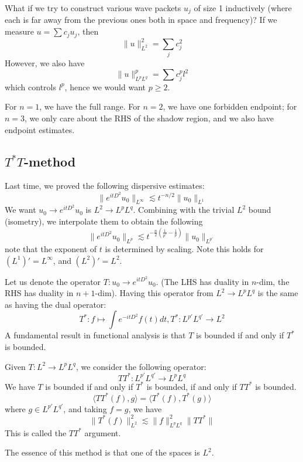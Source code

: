 What if we try to construct various wave packets $u_j$ of size 1 inductively (where each is far away from the previous ones both in space and frequency)? If we measure $u=\sum c_ju_j$, then 
\begin{equation*}
    \|u\|_{L^2}^2=\sum_jc_j^2
\end{equation*}
However, we also have
\begin{equation*}
    \|u\|_{L^pL^q}^p=\sum c_j^pl^2
\end{equation*}
which controls $l^p$, hence we would want $p\geq 2$. 

For $n=1$, we have the full range. For $n=2$, we have one forbidden endpoint; for $n=3$, we only care about the RHS of the shadow region, and we also have endpoint estimates.

\subsection{$T^*T$-method}
Last time, we proved the following dispersive estimates:
\begin{equation*}
    \|e^{itD^2}u_0\|_{L^\infty}\lesssim t^{-n/2}\|u_0\|_{L^1}
\end{equation*}
We want $u_0\to e^{itD^2}u_0$ is $L^2\to L^pL^q$. Combining with the trivial $L^2$ bound (isometry), we interpolate them to obtain the following
\begin{equation*}
    \|e^{itD^2}u_0\|_{L^p}\lesssim t^{-\frac{n}{2}(\frac{1}{p'}-\frac{1}{p})}\|u_0\|_{L^{p'}}
\end{equation*}
note that the exponent of $t$ is determined by scaling. Note this holds for $(L^1)'=L^\infty$, and $(L^2)'=L^2$.

Let us denote the operator $T: u_0\to e^{itD^2}u_0$. (The LHS has duality in $n$-dim, the RHS has duality in $n+1$-dim). Having this operator from $L^2\to L^pL^q$ is the same as having the dual operator:
\begin{equation*}
    T^*: f\mapsto \int e^{-itD^2}f(t)dt, T^*: L^{p'}L^{q'}\to L^2
\end{equation*}
A fundamental result in functional analysis is that $T$ is bounded if and only if $T^*$ is bounded.

\begin{definition}[$TT^*$-method]
    Given $T: L^2\to L^pL^q$, we consider the following operator:
    \begin{equation*}
        TT^*: L^{p'}L^{q'}\to L^pL^q
    \end{equation*}
    We have $T$ is bounded if and only if $T^*$ is bounded, if and only if $TT^*$ is bounded.
    \begin{equation*}
        \langle TT^*(f), g\rangle=\langle T^*(f), T^*(g)\rangle
    \end{equation*}
    where $g\in L^{p'}L^{q'}$, and taking $f=g$, we have
    \begin{equation*}
        \|T^*(f)\|_{L^2}^2\lesssim \|f\|_{L^pL^q}^2\|TT^*\|
    \end{equation*}
    This is called the $TT^*$ argument.
\end{definition}
\begin{remark}
    The essence of this method is that one of the spaces is $L^2$.
\end{remark}

